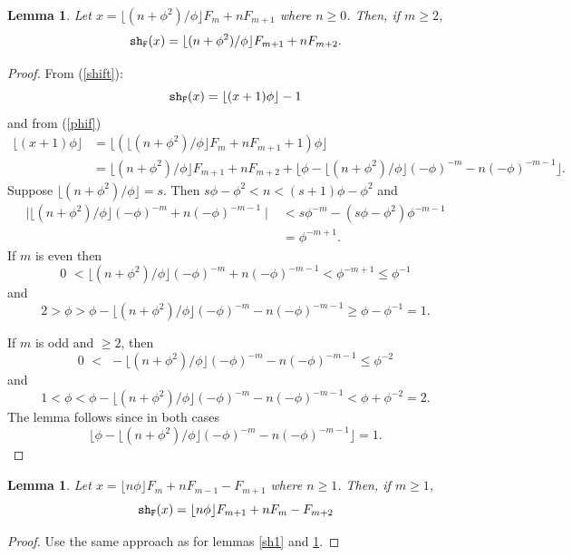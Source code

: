 \documentclass[12pt]{article}
\theoremstyle{plain}
\newtheorem{lemma}[theorem]{Lemma}
\theoremstyle{case}
\theoremstyle{definition}
\begin{document}
\begin{lemma}
\label{sh2}
Let $x =  \lfloor (n+ \phi^2)/\phi \rfloor F_m + n F_{m+1}$  where $n \geq 0$. Then, if $m \geq 2$,
$$
{\tt sh_F} (x)  =   \lfloor (n+ \phi^2)/\phi \rfloor F_{m+1} + n F_{m+2}.
$$
\end{lemma}
\begin{proof}
From (\ref{shift}):
$$
{\tt sh_F} (x)  = \lfloor  (x+1) \phi \rfloor - 1 
$$
and from (\ref{phif})
\begin{align*}
\lfloor  (x+1) \phi \rfloor &= \lfloor  (\lfloor (n+ \phi^2)/\phi \rfloor F_m + n F_{m+1}  +1) \phi \rfloor \\
 &= \lfloor (n+ \phi^2)/\phi \rfloor F_{m+1} + n F_{m+2}  + \lfloor  \phi - \lfloor (n+ \phi^2)/\phi \rfloor  (-\phi)^{-m} - n (-\phi)^{-m-1}  \rfloor .
\end{align*}
Suppose $\lfloor (n+ \phi^2)/\phi \rfloor = s$. Then $s \phi - \phi^2 < n < (s+1) \phi - \phi^2$ and
\begin{align*}
\mid   \lfloor (n+ \phi^2)/\phi \rfloor  (-\phi)^{-m} + n (-\phi)^{-m-1}  \mid &< s \phi^{-m} - (s \phi - \phi^2) \phi^{-m-1}  \\
 & = \phi^{-m+1} .
\end{align*}
If $m$ is even then
\begin{equation*}
0 \,\,<  \lfloor (n+ \phi^2)/\phi \rfloor  (-\phi)^{-m} + n (-\phi)^{-m-1} < \phi^{-m+1} \leq \phi^{-1}
\end{equation*}
and
$$
2 > \phi  >  \phi - \lfloor (n+ \phi^2)/\phi \rfloor  (-\phi)^{-m} - n (-\phi)^{-m-1}  \geq  \phi - \phi^{-1} = 1 .
$$

If $m$ is odd and $\geq 2$,  then
\begin{equation*}
0 \,\, < \,\, - \lfloor (n+ \phi^2)/\phi \rfloor  (-\phi)^{-m} - n (-\phi)^{-m-1}  \leq \phi^{-2} 
 \end{equation*}
and
$$
1 < \phi  <   \phi - \lfloor (n+ \phi^2)/\phi \rfloor  (-\phi)^{-m} - n (-\phi)^{-m-1}  < \phi + \phi^{-2} = 2 .
$$
The lemma follows since in both cases 
$$
 \lfloor  \phi - \lfloor (n+ \phi^2)/\phi \rfloor  (-\phi)^{-m} - n (-\phi)^{-m-1}  \rfloor = 1 .
$$
\end{proof}

\bigskip

\begin{lemma}
\label{sh3}
Let $x =  \lfloor n \phi \rfloor F_m + n F_{m-1} - F_{m+1}$  where $n \geq 1$. Then, if $m \geq 1$,
$$
{\tt sh_F} (x)  =  \lfloor n \phi \rfloor F_{m+1} + n F_{m} - F_{m+2}
$$
\end{lemma}
\begin{proof}
Use the same approach as for lemmas \ref{sh1} and \ref{sh2}.
\end{proof}
\end{document}
